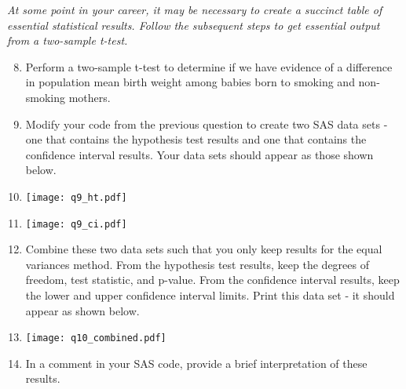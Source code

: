 \emph{At some point in your career, it may be necessary to create a succinct table of essential statistical results.  Follow the subsequent steps to get essential output from a two-sample t-test.}
\begin{enumerate}
\setcounter{enumi}{7}
\item Perform a two-sample t-test to determine if we have evidence of a difference in population mean birth weight among babies born to smoking and non-smoking mothers.
\item Modify your code from the previous question to create two SAS data sets - one that contains the hypothesis test results and one that contains the confidence interval results.  Your data sets should appear as those shown below.
\item[] \texttt{[image: q9\_ht.pdf]}
\item[] \texttt{[image: q9\_ci.pdf]}
\item Combine these two data sets such that you only keep results for the equal variances method.  From the hypothesis test results, keep the degrees of freedom, test statistic, and p-value.  From the confidence interval results, keep the lower and upper confidence interval limits.  Print this data set - it should appear as shown below.
\item[] \texttt{[image: q10\_combined.pdf]}
\item In a comment in your SAS code, provide a brief interpretation of these results.
\end{enumerate}
